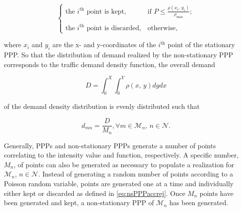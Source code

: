 \documentclass[12pt,dvipsnames]{report}
\begin{document}
\iftrue %
\begin{singlespacing}
\begin{equation} \label{eq:nsPPPaccrej}
\begin{cases}
	\text{the $i^{\text{th}}$ point is kept},& \text{if } P \leq \frac{\rho \left(x_i,\, y_i\right)}{\rho_{\max}};\\
	\\
	\text{the $i^{\text{th}}$ point is discarded},& \text{otherwise,}
\end{cases}
\end{equation}
\end{singlespacing}
\else
\begin{equation} \label{eq:nsPPPaccrej}
\begin{cases}
	\text{the $i^{\text{th}}$ point is kept},& \text{if } P \leq \frac{\rho \left(x_i,\, y_i\right)}{\rho_{\max}};\\
	\text{the $i^{\text{th}}$ point is discarded},& \text{otherwise,}
\end{cases}
\end{equation}
\fi

where $x_i$ and $y_i$ are the x- and y-coordinates of the $i^{\text{th}}$ point of the stationary PPP.  So that the distribution of demand realized by the non-stationary PPP corresponds to the traffic demand density function, the overall demand 

\begin{equation} \label{eq:demandintegral}
D = \int_0^X \int_0^Y \rho\left(x,\, y\right) dy dx
\end{equation}

of the demand density distribution is evenly distributed such that

\begin{equation} \label{eq:pointdemand}
d_{mn} = \frac{D}{M_n}, \forall m \in \mathcal{M}_n,\, n \in \mathcal{N}.
\end{equation}

Generally, PPPs and non-stationary PPPs generate a number of points correlating to the intensity value and function, respectively.  A specific number, $M_n$, of points can also be generated as necessary to populate a realization for $\mathcal{M}_n,\, n \in \mathcal{N}$.  Instead of generating a random number of points according to a Poisson random variable, points are generated one at a time and individually either kept or discarded as defined in \cref{eq:nsPPPaccrej}.  Once $M_n$ points have been generated and kept, a non-stationary PPP of $\mathcal{M}_n$ has been generated.
\end{document}
